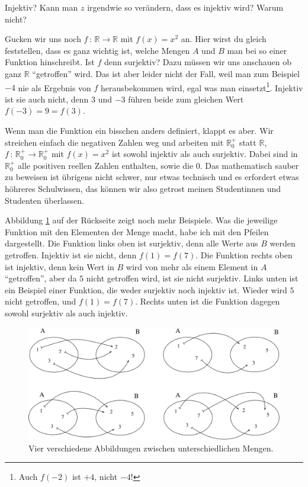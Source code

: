 \documentclass[a4paper,ngerman,12pt]{zirkelblatt1415}
\theoremstyle{definition}
\theoremstyle{remark}
\begin{document}
\begin{aufgabe}{Injektiv?}
 Kann man $z$ irgendwie so verändern, dass es injektiv wird? Warum nicht? 
\end{aufgabe}

Gucken wir uns noch $f \, : \, \mathbb{R} \to \mathbb{R}$ mit $f(x) = x^2$ an.
Hier wirst du gleich feststellen, dass es ganz wichtig ist, welche Mengen $A$ und $B$ man bei so einer Funktion hinschreibt.
Ist $f$ denn surjektiv? Dazu müssen wir uns anschauen ob ganz $\mathbb{R}$ "`getroffen"' wird.
Das ist aber leider nicht der Fall, weil man zum Beispiel $-4$ nie als Ergebnis von $f$ herausbekommen wird, egal was man einsetzt\footnote{ Auch $f(-2)$ ist $+4$, nicht $-4$!}.
Injektiv ist sie auch nicht, denn $3$ und $-3$ führen beide zum gleichen Wert $f(-3) = 9 = f(3)$.

Wenn man die Funktion ein bisschen anders definiert, klappt es aber.
Wir streichen einfach die negativen Zahlen weg und arbeiten mit $\mathbb{R}^+_0$ statt $ \mathbb{R}$,
$f \, : \, \mathbb{R}^+_0 \to \mathbb{R}^+_0$ mit $f(x) = x^2$ ist sowohl injektiv als auch surjektiv.
Dabei sind in $\mathbb{R}^+_0$ alle positiven reellen Zahlen enthalten, sowie die $0$.
Das mathematisch sauber zu beweisen ist übrigens nicht schwer, nur etwas technisch und es erfordert etwas höhreres Schulwissen, das können 
wir also getrost meinen Studentinnen und Studenten überlassen.

Abbildung \ref{abbb1} auf der Rückseite zeigt noch mehr Beispiele. Was die jeweilige Funktion mit den Elementen der Menge macht, habe ich mit den Pfeilen dargestellt.
Die Funktion links oben ist surjektiv, denn alle Werte aus $B$ werden getroffen. Injektiv ist sie nicht, denn $f(1) = f(7)$.
Die Funktion rechts oben ist injektiv, denn kein Wert in $B$ wird von mehr als einem Element in $A$ "`getroffen"', 
aber da $5$ nicht getroffen wird, ist sie nicht surjektiv.
Links unten ist ein Beispiel einer Funktion, die weder surjektiv noch injektiv ist. 
Wieder wird $5$ nicht getroffen, und $f(1) = f(7)$.
Rechts unten ist die Funktion dagegen sowohl surjektiv als auch injektiv.

\begin{figure}
\begin{center}
 \hspace*{-1cm}\includegraphics[scale = 0.3]{bilder/abb1}
 \caption{Vier verschiedene Abbildungen zwischen unterschiedlichen Mengen.} \label{abbb1}
\end{center}
\end{figure}
\end{document}
